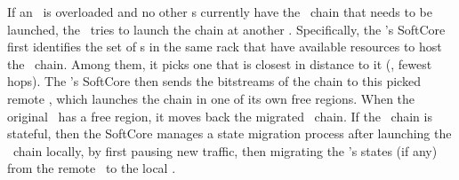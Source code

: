 
If an \snic\ is overloaded and no other \snic{}s currently have the \nt\ chain that needs to be launched, the \snic\ tries to launch the chain at another \snic.
Specifically, the \snic's SoftCore first identifies the set of \snic{}s in the same rack that have available resources to host the \nt\ chain.
Among them, it picks one that is closest in distance to it (\ie, fewest hops).
The \snic's SoftCore then sends the bitstreams of the \nt{} chain to this picked remote \snic, which launches the chain in one of its own free regions.
When the original \snic\ has a free region, it moves back the migrated \nt\ chain. 
If the \nt\ chain is stateful, then the SoftCore manages a state migration process after launching the \nt\ chain locally, by first pausing new traffic, then migrating the \nt's states (if any) from the remote \snic\ to the local \snic. %

